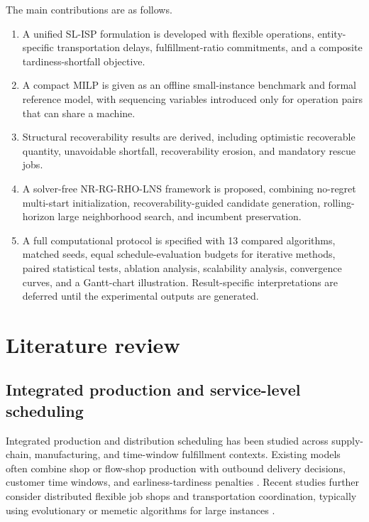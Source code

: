 \documentclass[a4paper,fleqn]{cas-sc}
\begin{document}
The main contributions are as follows.
\begin{enumerate}
    \item A unified SL-ISP formulation is developed with flexible operations, entity-specific transportation delays, fulfillment-ratio commitments, and a composite tardiness-shortfall objective.
    \item A compact MILP is given as an offline small-instance benchmark and formal reference model, with sequencing variables introduced only for operation pairs that can share a machine.
    \item Structural recoverability results are derived, including optimistic recoverable quantity, unavoidable shortfall, recoverability erosion, and mandatory rescue jobs.
    \item A solver-free NR-RG-RHO-LNS framework is proposed, combining no-regret multi-start initialization, recoverability-guided candidate generation, rolling-horizon large neighborhood search, and incumbent preservation.
    \item A full computational protocol is specified with 13 compared algorithms, matched seeds, equal schedule-evaluation budgets for iterative methods, paired statistical tests, ablation analysis, scalability analysis, convergence curves, and a Gantt-chart illustration. Result-specific interpretations are deferred until the experimental outputs are generated.
\end{enumerate}

\section{Literature review}
\label{sec:literature}

\subsection{Integrated production and service-level scheduling}
\label{sec:lit_ipds}

Integrated production and distribution scheduling has been studied across supply-chain, manufacturing, and time-window fulfillment contexts. Existing models often combine shop or flow-shop production with outbound delivery decisions, customer time windows, and earliness-tardiness penalties \citep{sawik_integrated_2016,hou_modelling_2022}. Recent studies further consider distributed flexible job shops and transportation coordination, typically using evolutionary or memetic algorithms for large instances \citep{zhang_cooperative_2024,zhao_learning-driven_2025,jia_learning-and-knowledge-assisted_2025}.
\end{document}
